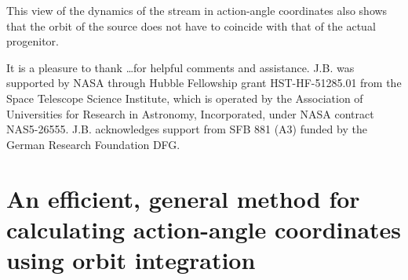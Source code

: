 \documentclass[12pt,preprint]{aastex}
\begin{document}
This view of the dynamics of the stream in action-angle coordinates
also shows that the orbit of the source does not have to coincide with
that of the actual progenitor. 




\acknowledgements It is a pleasure to thank \dots for helpful comments
and assistance. J.B. was supported by NASA through Hubble Fellowship
grant HST-HF-51285.01 from the Space Telescope Science Institute,
which is operated by the Association of Universities for Research in
Astronomy, Incorporated, under NASA contract NAS5-26555. J.B.
acknowledges support from SFB 881 (A3) funded by the German Research
Foundation DFG.


\appendix

\section{An efficient, general method for calculating action-angle coordinates using orbit integration}\label{sec:aa}
\end{document}
